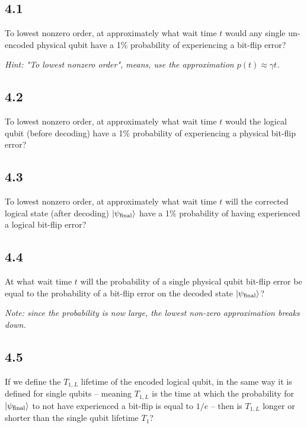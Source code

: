 \documentclass[11pt]{article}
\begin{document}
\subsection{4.1}
To lowest nonzero order, at approximately what wait time $t$ would any single un-encoded physical qubit have a 1\% probability of experiencing a bit-flip error?

\textit{Hint: "To lowest nonzero order", means, use the approximation $p(t) \approx \gamma t$.}

\subsection{4.2}
To lowest nonzero order, at approximately what wait time $t$ would the logical qubit (before decoding) have a 1\% probability of experiencing a physical bit-flip error?

\subsection{4.3}
To lowest nonzero order, at approximately what wait time $t$ will the corrected logical state (after decoding) $\ket{\psi_{\text{final}}}$ have a 1\% probability of having experienced a logical bit-flip error?

\subsection{4.4}
At what wait time $t$ will the probability of a single physical qubit bit-flip error be equal to the probability of a bit-flip error on the decoded state $\ket{\psi_{\text{final}}}$?

\textit{Note: since the probability is now large, the lowest non-zero approximation breaks down.}

\subsection{4.5}
If we define the $T_{1,L}$ lifetime of the encoded logical qubit, in the same way it is defined for single qubits -- meaning $T_{1,L}$ is the time at which the probability for $\ket{\psi_{\text{final}}}$ to not have experienced a bit-flip is equal to $1/e$ -- then is $T_{1,L}$ longer or shorter than the single qubit lifetime $T_1$?
\end{document}
